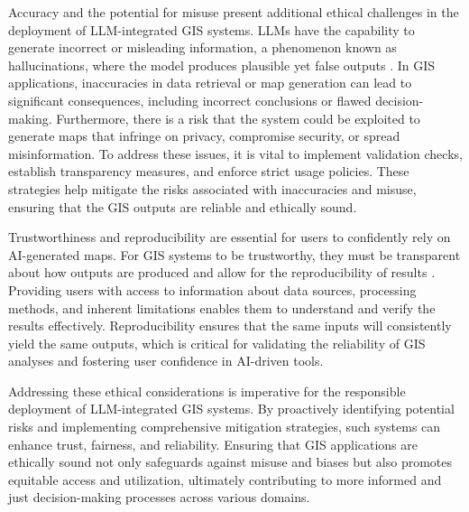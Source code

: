 Accuracy and the potential for misuse present additional ethical challenges in the deployment of LLM-integrated GIS systems. LLMs have the capability to generate incorrect or misleading information, a phenomenon known as hallucinations, where the model produces plausible yet false outputs \cite{shuster_retrieval_2021}. In GIS applications, inaccuracies in data retrieval or map generation can lead to significant consequences, including incorrect conclusions or flawed decision-making. Furthermore, there is a risk that the system could be exploited to generate maps that infringe on privacy, compromise security, or spread misinformation. To address these issues, it is vital to implement validation checks, establish transparency measures, and enforce strict usage policies. These strategies help mitigate the risks associated with inaccuracies and misuse, ensuring that the GIS outputs are reliable and ethically sound.

Trustworthiness and reproducibility are essential for users to confidently rely on AI-generated maps. For GIS systems to be trustworthy, they must be transparent about how outputs are produced and allow for the reproducibility of results \cite{Li20234668, zhang_ethics_2023, wang_gpt_2024}. Providing users with access to information about data sources, processing methods, and inherent limitations enables them to understand and verify the results effectively. Reproducibility ensures that the same inputs will consistently yield the same outputs, which is critical for validating the reliability of GIS analyses and fostering user confidence in AI-driven tools.

Addressing these ethical considerations is imperative for the responsible deployment of LLM-integrated GIS systems. By proactively identifying potential risks and implementing comprehensive mitigation strategies, such systems can enhance trust, fairness, and reliability. Ensuring that GIS applications are ethically sound not only safeguards against misuse and biases but also promotes equitable access and utilization, ultimately contributing to more informed and just decision-making processes across various domains.